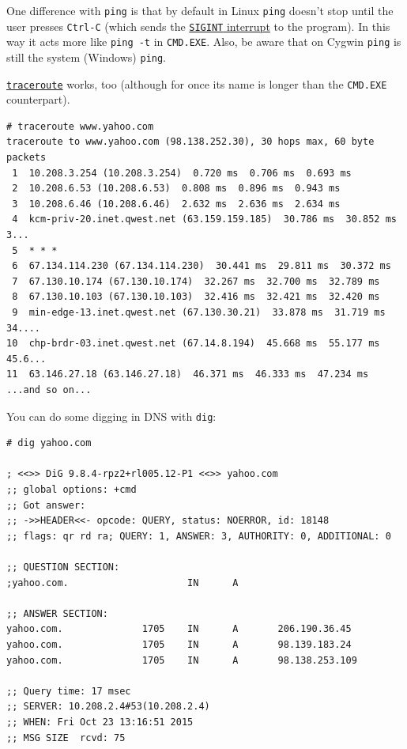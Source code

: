 \documentclass[10pt,]{book}
\numberwithin{figure}{chapter}
\begin{document}
One difference with \texttt{ping} is that by default in Linux
\texttt{ping} doesn't stop until the user presses \texttt{Ctrl-C} (which
sends the
\href{https://en.wikipedia.org/wiki/Unix_signal}{\texttt{SIGINT}
interrupt} to the program). In this way it acts more like
\texttt{ping -t} in \texttt{CMD.EXE}. Also, be aware that on Cygwin
\texttt{ping} is still the system (Windows) \texttt{ping}.

\href{http://linux.die.net/man/8/traceroute}{\texttt{traceroute}} works,
too (although for once its name is longer than the \texttt{CMD.EXE}
counterpart).

\begin{verbatim}
# traceroute www.yahoo.com
traceroute to www.yahoo.com (98.138.252.30), 30 hops max, 60 byte packets
 1  10.208.3.254 (10.208.3.254)  0.720 ms  0.706 ms  0.693 ms
 2  10.208.6.53 (10.208.6.53)  0.808 ms  0.896 ms  0.943 ms
 3  10.208.6.46 (10.208.6.46)  2.632 ms  2.636 ms  2.634 ms
 4  kcm-priv-20.inet.qwest.net (63.159.159.185)  30.786 ms  30.852 ms  3...
 5  * * *
 6  67.134.114.230 (67.134.114.230)  30.441 ms  29.811 ms  30.372 ms
 7  67.130.10.174 (67.130.10.174)  32.267 ms  32.700 ms  32.789 ms
 8  67.130.10.103 (67.130.10.103)  32.416 ms  32.421 ms  32.420 ms
 9  min-edge-13.inet.qwest.net (67.130.30.21)  33.878 ms  31.719 ms  34....
10  chp-brdr-03.inet.qwest.net (67.14.8.194)  45.668 ms  55.177 ms  45.6...
11  63.146.27.18 (63.146.27.18)  46.371 ms  46.333 ms  47.234 ms
...and so on...
\end{verbatim}

You can do some digging in DNS with \texttt{dig}:

\begin{verbatim}
# dig yahoo.com

; <<>> DiG 9.8.4-rpz2+rl005.12-P1 <<>> yahoo.com
;; global options: +cmd
;; Got answer:
;; ->>HEADER<<- opcode: QUERY, status: NOERROR, id: 18148
;; flags: qr rd ra; QUERY: 1, ANSWER: 3, AUTHORITY: 0, ADDITIONAL: 0

;; QUESTION SECTION:
;yahoo.com.                     IN      A

;; ANSWER SECTION:
yahoo.com.              1705    IN      A       206.190.36.45
yahoo.com.              1705    IN      A       98.139.183.24
yahoo.com.              1705    IN      A       98.138.253.109

;; Query time: 17 msec
;; SERVER: 10.208.2.4#53(10.208.2.4)
;; WHEN: Fri Oct 23 13:16:51 2015
;; MSG SIZE  rcvd: 75
\end{verbatim}
\end{document}
